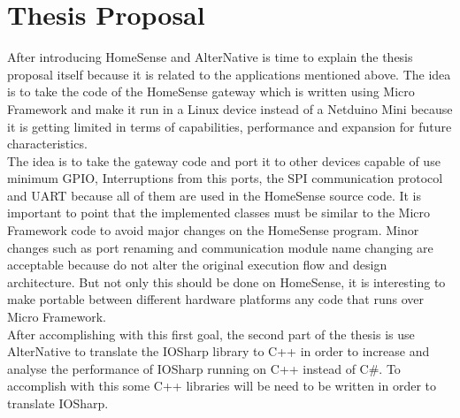 \section{Thesis Proposal}\label{S:Proposal-Thesis-Proposal}
After introducing HomeSense and AlterNative is time to explain the thesis proposal itself because it is related to the applications mentioned above. The idea is to take the code of the HomeSense gateway which is written using Micro Framework and make it run in a Linux device instead of a Netduino Mini because it is getting limited in terms of capabilities, performance and expansion for future characteristics.
\\
The idea is to take the gateway code and port it to other devices capable of use minimum GPIO, Interruptions from this ports, the SPI communication protocol and UART because all of them are used in the HomeSense source code. It is important to point that the implemented classes must be similar to the Micro Framework code to avoid major changes on the HomeSense program. Minor changes such as port renaming and communication module name changing are acceptable because do not alter the original execution flow and design architecture. But not only this should be done on HomeSense, it is interesting to make portable between different hardware platforms any code that runs over Micro Framework.
\\
After accomplishing with this first goal, the second part of the thesis is use AlterNative to translate the IOSharp library to C++ in order to increase and analyse the performance of IOSharp running on C++ instead of C\#. To accomplish with this some C++ libraries will be need to be written in order to translate IOSharp.